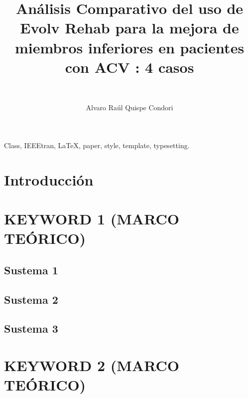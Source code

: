 \documentclass[journal]{IEEEtran}
\begin{document}
\title{Análisis Comparativo del uso de Evolv Rehab para la mejora de miembros inferiores en pacientes con ACV : 4 casos}

\author{%
\\
}
\author{Alvaro Raúl Quispe Condori\\
}


\maketitle

\begin{abstract}
   
   
   
   
\end{abstract}

\begin{IEEEkeywords}
Class, IEEEtran, \LaTeX, paper, style, template, typesetting.
\end{IEEEkeywords}


\section{Introducción}
\section{KEYWORD 1 (MARCO TEÓRICO)}
\subsection{Sustema 1}
\subsection{Sustema 2}
\subsection{Sustema 3}

\section{KEYWORD 2 (MARCO TEÓRICO)}
\end{document}
